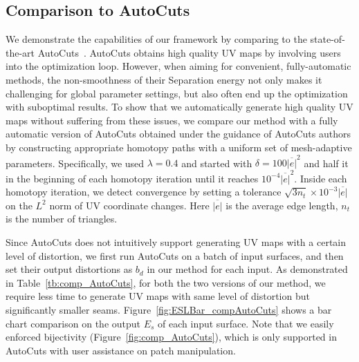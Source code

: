 \subsection{Comparison to AutoCuts}

We demonstrate the capabilities of our framework by comparing to the state-of-the-art AutoCuts~\cite{Poranne2017Autocuts}.
AutoCuts obtains high quality UV maps by involving users into the optimization loop. However, when aiming for convenient, fully-automatic methods, the non-smoothness of their Separation energy not only makes it challenging for global parameter settings, but also often end up the optimization with suboptimal results. To show that we automatically generate high quality UV maps without suffering from these issues, we compare our method with a fully automatic version of AutoCuts obtained under the guidance of AutoCuts authors by constructing appropriate homotopy paths with a uniform set of mesh-adaptive parameters. 
Specifically, we used $\lambda = 0.4$ and started with $\delta=100\overline{|e|}^2$ and half it in the beginning of each homotopy iteration until it reaches $10^{-4}\overline{|e|}^2$. Inside each homotopy iteration, we detect convergence by setting a tolerance $\sqrt{3n_t}\times10^{-3}\overline{|e|}$ on the $L^2$ norm of UV coordinate changes. Here $\overline{|e|}$ is the average edge length, $n_t$ is the number of triangles.

Since AutoCuts does not intuitively support generating UV maps with a certain level of distortion, we first run AutoCuts on a batch of input surfaces, and then set their output distortions as $b_d$ in our method for each input. As demonstrated in Table~\ref{tb:comp_AutoCuts}, for both the two versions of our method, we require less time to generate UV maps with same level of distortion but significantly smaller seams. Figure~\ref{fig:ESLBar_compAutoCuts} shows a bar chart comparison on the output $E_{s}$ of each input surface. Note that we easily enforced bijectivity (Figure~\ref{fig:comp_AutoCuts}), which is only supported in AutoCuts with user assistance on patch manipulation.

